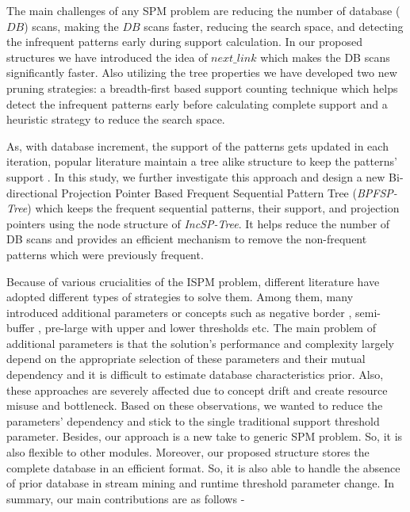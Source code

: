 The main challenges of any SPM problem are reducing the number of database ($DB$) scans, making the $DB$ scans faster, reducing the search space, and detecting the infrequent patterns early during support calculation. In our proposed structures we have introduced the idea of $next\_link$ which makes the DB scans significantly faster. Also utilizing the tree properties we have developed two new pruning strategies: a breadth-first based support counting technique which helps detect the infrequent patterns early before calculating complete support and a heuristic strategy to reduce the search space.

As, with database increment, the support of the patterns gets updated in each iteration, popular literature maintain a tree alike structure to keep the patterns' support \cite{chen2007incremental,liu2012incremental,lin2015incrementally}. In this study, we further investigate this approach and design a new Bi-directional Projection Pointer Based Frequent Sequential Pattern Tree (\textit{BPFSP-Tree}) which keeps the frequent sequential patterns, their support, and projection pointers using the node structure of \textit{IncSP-Tree}. It helps reduce the number of DB scans and provides an efficient mechanism to remove the non-frequent patterns which were previously frequent.


Because of various crucialities of the ISPM problem, different literature have adopted different types of strategies to solve them. Among them, many introduced additional parameters or concepts such as negative border \cite{zheng2002algorithms}, semi-buffer \cite{cheng2004incspan}, pre-large with upper and lower thresholds \cite{lin2015incrementally} etc. The main problem of additional parameters is that the solution's performance and complexity largely depend on the appropriate selection of these parameters and their mutual dependency and it is difficult to estimate database characteristics prior. Also, these approaches are severely affected due to concept drift and create resource misuse and bottleneck.  Based on these observations, we wanted to reduce the parameters' dependency and stick to the single traditional support threshold parameter. Besides, our approach is a new take to generic SPM problem. So, it is also flexible to other modules. Moreover, our proposed structure stores the complete database in an efficient format. So, it is also able to handle the absence of prior database in stream mining and runtime threshold parameter change. In summary, our main contributions are as follows -

